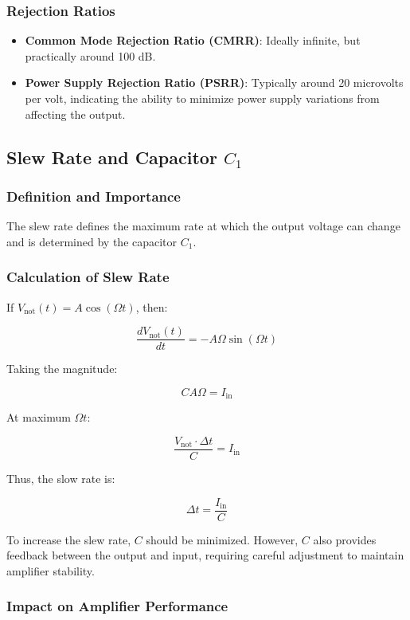 \documentclass[a4paper,9pt,twoside,openany,twocolumn]{memoir}
\begin{document}
\subsubsection{Rejection Ratios}

\begin{itemize}
    \item \textbf{Common Mode Rejection Ratio (CMRR)}: Ideally infinite, but practically around 100 dB.
    \item \textbf{Power Supply Rejection Ratio (PSRR)}: Typically around 20 microvolts per volt, indicating the ability to minimize power supply variations from affecting the output.
\end{itemize}

\subsection{Slew Rate and Capacitor \( C_1 \)}

\subsubsection{Definition and Importance}

The slew rate defines the maximum rate at which the output voltage can change and is determined by the capacitor \( C_1 \).

\subsubsection{Calculation of Slew Rate}

If \( V_{\text{not}}(t) = A \cos(\Omega t) \), then:

\[
\frac{dV_{\text{not}}(t)}{dt} = -A \Omega \sin(\Omega t)
\]

Taking the magnitude:

\[
C A \Omega = I_{\text{in}}
\]

At maximum \( \Omega t \):

\[
\frac{V_{\text{not}} \cdot \Delta t}{C} = I_{\text{in}}
\]

Thus, the slow rate is:

\[
\Delta t = \frac{I_{\text{in}}}{C}
\]

To increase the slew rate, \( C \) should be minimized. However, \( C \) also provides feedback between the output and input, requiring careful adjustment to maintain amplifier stability.

\subsubsection{Impact on Amplifier Performance}
\end{document}
